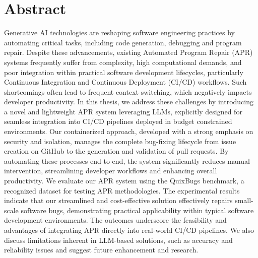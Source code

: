 \thispagestyle{empty}       %

\section*{Abstract}
Generative AI technologies are reshaping software engineering practices by automating critical tasks, including code generation, debugging and program repair. Despite these advancements, existing Automated Program Repair (APR) systems frequently suffer from complexity, high computational demands, and poor integration within practical software development lifecycles, particularly Continuous Integration and Continuous Deployment (CI/CD) workflows. Such shortcomings often lead to frequent context switching, which negatively impacts developer productivity. \break
In this thesis, we address these challenges by introducing a novel and lightweight APR system leveraging LLMs, explicitly designed for seamless integration into CI/CD pipelines deployed in budget constrained environments. Our containerized approach, developed with a strong emphasis on security and isolation, manages the complete bug-fixing lifecycle from issue creation on GitHub to the generation and validation of pull requests. By automating these processes end-to-end, the system significantly reduces manual intervention, streamlining developer workflows and enhancing overall productivity.\break
We evaluate our APR system using the QuixBugs benchmark, a recognized dataset for testing APR methodologies. The experimental results indicate that our streamlined and cost-effective solution effectively repairs small-scale software bugs, demonstrating practical applicability within typical software development environments. \break
The outcomes underscore the feasibility and advantages of integrating APR directly into real-world CI/CD pipelines. We also discuss limitations inherent in LLM-based solutions, such as accuracy and reliability issues and suggest future enhancement and research.